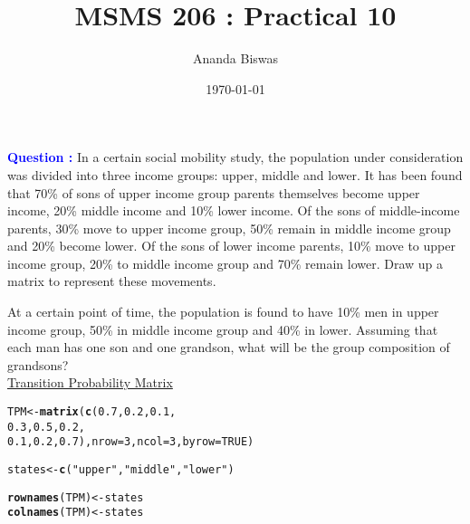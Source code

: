 \documentclass[11pt, a4paper]{article}\usepackage[]{graphicx}\usepackage[]{xcolor}
\title{MSMS 206 : Practical 10}
\author{Ananda Biswas}
\date{\today}
\makeatletter
\newcommand{\hlnum}[1]{\textcolor[rgb]{0.686,0.059,0.569}{#1}}%
\newcommand{\hlsng}[1]{\textcolor[rgb]{0.192,0.494,0.8}{#1}}%
\newcommand{\hldef}[1]{\textcolor[rgb]{0.345,0.345,0.345}{#1}}%
\newcommand{\hlkwb}[1]{\textcolor[rgb]{0.69,0.353,0.396}{#1}}%
\newcommand{\hlkwc}[1]{\textcolor[rgb]{0.333,0.667,0.333}{#1}}%
\newcommand{\hlkwd}[1]{\textcolor[rgb]{0.737,0.353,0.396}{\textbf{#1}}}%
\newenvironment{kframe}{%
 \def\at@end@of@kframe{}%
 \ifinner\ifhmode%
  \def\at@end@of@kframe{\end{minipage}}%
  \begin{minipage}{\columnwidth}%
 \fi\fi%
 \def\FrameCommand##1{\hskip\@totalleftmargin \hskip-\fboxsep
 \colorbox{shadecolor}{##1}\hskip-\fboxsep
     \hskip-\linewidth \hskip-\@totalleftmargin \hskip\columnwidth}%
 \MakeFramed {\advance\hsize-\width
   \@totalleftmargin\z@ \linewidth\hsize
   \@setminipage}}%
 {\par\unskip\endMakeFramed%
 \at@end@of@kframe}
\newenvironment{knitrout}{}{} %
\makeatother
\begin{document}
\maketitle


 \hspace{0.2cm} \textcolor{blue}{\textbf{Question : }} In a certain social mobility study, the population under consideration was divided into three income groups: upper, middle and lower. It has been found that 70\% of sons of upper income group parents themselves become upper income, 20\% middle income and 10\% lower income. Of the sons of middle-income parents, 30\% move to upper income group, 50\% remain in middle income group and 20\% become lower. Of the sons of lower income parents, 10\% move to upper income group, 20\% to middle income group and 70\% remain lower. Draw up a matrix to represent these movements.

At a certain point of time, the population is found to have 10\% men in upper income group, 50\% in middle income group and 40\% in lower. Assuming that each man has one son and one grandson, what will be the group composition of grandsons? \\[1.5em]


\faArrowAltCircleRight[regular] \hspace{0.2cm} \underline{Transition Probability Matrix}

\begin{knitrout}
\color{fgcolor}\begin{kframe}
\begin{alltt}
\hldef{TPM} \hlkwb{<-} \hlkwd{matrix}\hldef{(}\hlkwd{c}\hldef{(}\hlnum{0.7}\hldef{,} \hlnum{0.2}\hldef{,} \hlnum{0.1}\hldef{,}
                \hlnum{0.3}\hldef{,} \hlnum{0.5}\hldef{,} \hlnum{0.2}\hldef{,}
                \hlnum{0.1}\hldef{,} \hlnum{0.2}\hldef{,} \hlnum{0.7}\hldef{),} \hlkwc{nrow} \hldef{=} \hlnum{3}\hldef{,} \hlkwc{ncol} \hldef{=} \hlnum{3}\hldef{,} \hlkwc{byrow} \hldef{=} \hlnum{TRUE}\hldef{)}

\hldef{states} \hlkwb{<-} \hlkwd{c}\hldef{(}\hlsng{"upper"}\hldef{,} \hlsng{"middle"}\hldef{,} \hlsng{"lower"}\hldef{)}

\hlkwd{rownames}\hldef{(TPM)} \hlkwb{<-} \hldef{states}
\hlkwd{colnames}\hldef{(TPM)} \hlkwb{<-} \hldef{states}
\end{alltt}
\end{kframe}
\end{knitrout}
\end{document}
